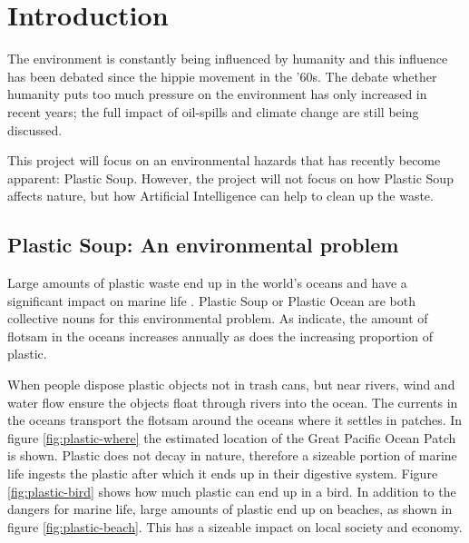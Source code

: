\section{Introduction}
\label{sec:Introduction}
The environment is constantly being influenced by humanity and this influence has been debated since the hippie movement in the '60s.
The debate whether humanity puts too much pressure on the environment has only increased in recent years; the full impact of oil-spills and climate change are still being discussed.

This project will focus on an environmental hazards that has recently become apparent: Plastic Soup.
However, the project will not focus on how Plastic Soup affects nature, but how Artificial Intelligence can help to clean up the waste.



\subsection{Plastic Soup: An environmental problem}
\label{sec:Intro-Plastic Soup}
Large amounts of plastic waste end up in the world's oceans and have a significant impact on marine life \citep{barnes2005drifting}.
Plastic Soup or Plastic Ocean are both collective nouns for this environmental problem.
As \citeauthor{barnes2005drifting} indicate, the amount of flotsam in the oceans increases annually as does the increasing proportion of plastic.

When people dispose plastic objects not in trash cans, but near rivers, wind and water flow ensure the objects float through rivers into the ocean.
The currents in the oceans transport the flotsam around the oceans where it settles in patches.
In figure \ref{fig:plastic-where} the estimated location of the Great Pacific Ocean Patch is shown.
Plastic does not decay in nature, therefore a sizeable portion of marine life ingests the plastic after which it ends up in their digestive system. 
Figure \ref{fig:plastic-bird} shows how much plastic can end up in a bird.
In addition to the dangers for marine life, large amounts of plastic end up on beaches, as shown in figure \ref{fig:plastic-beach}.
This has a sizeable impact on local society and economy.

